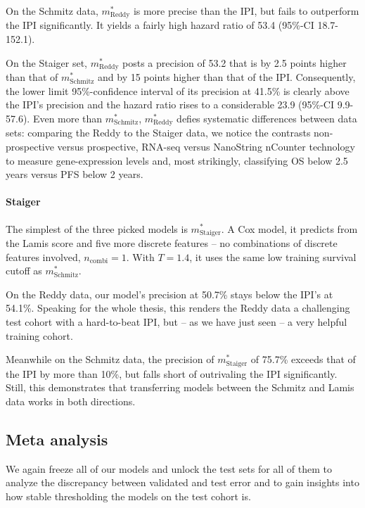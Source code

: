 On the Schmitz data, $m^*_\text{Reddy}$ is more precise than the IPI, but fails to outperform the 
IPI significantly. It yields a fairly high hazard ratio of \num{53.4} 
(\num{95}\%-CI \num{18.7}-\num{152.1}).

On the Staiger set, $m^*_\text{Reddy}$ posts a precision of \num{53.2} that is by \num{2.5} 
points higher than that of $m^*_\text{Schmitz}$ and by \num{15} points higher than that of the IPI. 
Consequently, the lower limit \num{95}\%-confidence interval of its precision at \num{41.5}\% is 
clearly above the IPI's precision and the hazard ratio rises to a considerable \num{23.9}
(\num{95}\%-CI \num{9.9}-\num{57.6}). Even more than $m^*_\text{Schmitz}$, $m^*_\text{Reddy}$ 
defies systematic differences between data sets: comparing the Reddy to the Staiger data, we 
notice the contrasts non-prospective versus prospective, 
RNA-seq versus NanoString nCounter technology to measure gene-expression levels and, most strikingly, 
classifying OS below \num{2.5} years versus PFS below \num{2} years.

\paragraph{Staiger}
The simplest of the three picked models is $m^*_\text{Staiger}$. A Cox model, it predicts from 
the Lamis score and five more discrete features -- no combinations of discrete features involved, 
$n_\text{combi} = 1$. With $T = \num{1.4}$, it uses the same low training survival cutoff as 
$m^*_\text{Schmitz}$.

On the Reddy data, our model's precision at \num{50.7}\% stays below the IPI's at \num{54.1}\%. 
Speaking for the whole thesis, this renders the Reddy data a challenging test cohort with a 
hard-to-beat IPI, but -- as we have just seen -- a very helpful training cohort.

Meanwhile on the Schmitz data, the precision of $m^*_\text{Staiger}$ of \num{75.7}\% exceeds that 
of the IPI by more than \num{10}\%, but falls short of outrivaling the IPI significantly. Still, 
this demonstrates that transferring models between the Schmitz and Lamis data works in both 
directions.

\subsection{Meta analysis}

We again freeze all of our models and unlock the test sets for all of them to analyze the discrepancy 
between validated and test error and to gain insights into how stable thresholding the models on the 
test cohort is.

